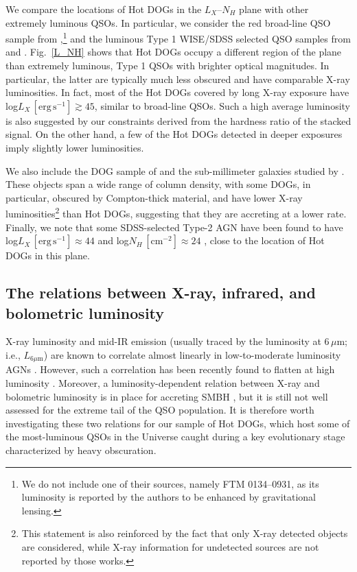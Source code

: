 \documentclass[useAMS,usenatbib]{mnras}
\newcommand*{\lunit}{\ensuremath{\mathrm{erg\,s^{-1}}}}
\newcommand*{\nhunits}{\mathrm{cm^{-2}}}
\begin{document}
We compare the locations of Hot DOGs in the $L_X$--$N_H$ plane with other extremely luminous QSOs. In particular, we consider the red broad-line QSO sample from \cite{Urrutia05},\footnote{We do not include one of their sources, namely FTM 0134--0931, as its luminosity is reported by the authors to be enhanced by gravitational lensing.} and the luminous Type 1 WISE/SDSS selected QSO samples from \cite{Martocchia17} and \cite{Mountrichas17}. Fig.~\ref{L_NH} shows that Hot DOGs occupy a different region of the plane than extremely luminous, Type 1 QSOs with brighter optical magnitudes. In particular, the latter are typically much less obscured and have comparable \mbox{X-ray} luminosities. In fact, most of the Hot DOGs covered by long X-ray exposure have log$L_X\,[\lunit]\gtrsim45$, similar to broad-line QSOs. Such a high average luminosity is also suggested by our constraints derived from the hardness ratio of the stacked signal. On the other hand, a few of the Hot DOGs detected in deeper
	exposures imply slightly lower luminosities.

	
We also include the DOG sample of \cite{Corral16} and the sub-millimeter galaxies studied by \cite{Wang13}. These objects span a wide range of column density, with some DOGs, in particular, obscured by Compton-thick material, and have lower X-ray luminosities\footnote{This statement is also reinforced by the fact that only X-ray detected objects are considered, while X-ray information for undetected sources are not reported by those works.} than Hot DOGs, suggesting that they are accreting at a lower rate. Finally, we note that some SDSS-selected Type-2 AGN have been found to have log$L_X\,[\lunit]\approx44$ and log$N_H\,[\nhunits]\approx24$ \citep[e.g.,][]{Lansbury15}, close to the location of Hot DOGs in this plane.


\subsection{The relations between X-ray, infrared, and bolometric luminosity}

X-ray luminosity and mid-IR  emission (usually traced by the luminosity at $6\,\mu$m; i.e., $L_{6\mu\mathrm{m}}$) are known to correlate almost linearly in low-to-moderate luminosity AGNs \citep[e.g.;][]{Lutz04,Fiore09,Gandhi09, Lanzuisi09}. However, such a correlation has been recently found to flatten at high luminosity \citep[e.g.][]{Stern15,Chen17}. Moreover, a luminosity-dependent relation between X-ray and bolometric luminosity is in place for accreting SMBH \citep[e.g.][]{Marconi04, Lusso12}, but it is still not well assessed for the extreme tail of the QSO population.
It is therefore worth investigating these two relations for our sample of Hot DOGs, which host some of the most-luminous QSOs in the Universe caught during a key evolutionary stage characterized by heavy obscuration.
\end{document}
